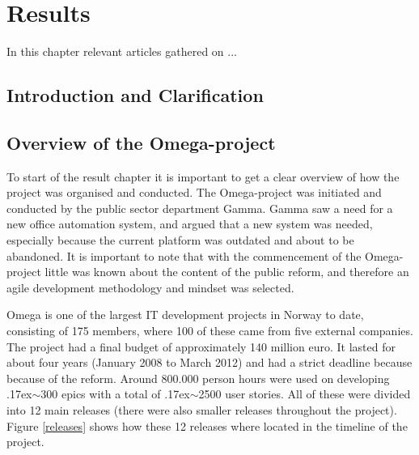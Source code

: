 \chapter{Results}
\label{results}

\minitoc

In this chapter relevant articles gathered on ...


\newpage

\section{Introduction and Clarification}

\section{Overview of the Omega-project}

To start of the result chapter it is important to get a clear overview of how the project was organised and conducted. The Omega-project was initiated and conducted by the public sector department Gamma. Gamma saw a need for a new office automation system, and argued that a new system was needed, especially because the current platform was outdated and about to be abandoned. It is important to note that with the commencement of the Omega-project little was known about the content of the public reform, and therefore an agile development methodology and mindset was selected.

Omega is one of the largest IT development projects in Norway to date, consisting of 175 members, where 100 of these came from five external companies. The project had a final budget of approximately 140 million euro. It lasted for about four years (January 2008 to March 2012) and had a strict deadline because because of the reform. Around 800.000 person hours were used on developing {\raise.17ex\hbox{$\scriptstyle\mathtt{\sim}$}}300 epics with a total of {\raise.17ex\hbox{$\scriptstyle\mathtt{\sim}$}}2500 user stories. All of these were divided into 12 main releases (there were also smaller releases throughout the project). Figure \ref{releases} shows how these 12 releases where located in the timeline of the project.

